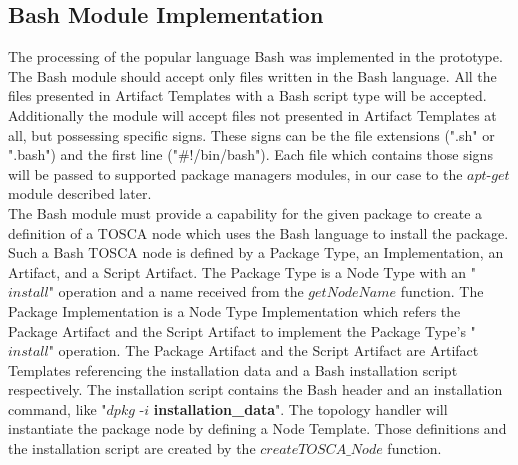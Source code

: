 \subsection*{Bash Module Implementation}
The processing of the popular language Bash was implemented in the prototype. 
The Bash module should accept only files written in the Bash language.
All the files presented in Artifact Templates with a Bash script type will be accepted.
Additionally the module will accept files not presented in Artifact Templates at all, but possessing specific signs.
These signs can be the file extensions (".sh" or ".bash") and the first line ("\#!/bin/bash"). 
Each file which contains those signs will be passed to supported package managers modules, in our case to the $apt$-$get$ module described later. \\
The Bash module must provide a capability for the given package to create a definition of a TOSCA node which uses the Bash language to install the package.
Such a Bash TOSCA node is defined by a Package Type, an  Implementation, an  Artifact, and a Script Artifact.
The Package Type is a Node Type with an "$install$" operation and a name received from the $getNodeName$ function.
The Package Implementation is a Node Type Implementation which refers the Package Artifact and the Script Artifact to implement the Package Type's "$install$" operation.
The Package Artifact and the Script Artifact are Artifact Templates referencing the installation data and a Bash installation script respectively.
The installation script contains the Bash header and an installation command, like "$dpkg$ -$i$ \textbf{installation\_data}".
The topology handler will instantiate the package node by defining a Node Template.
Those definitions and the installation script are created by the $createTOSCA\_Node$ function.

